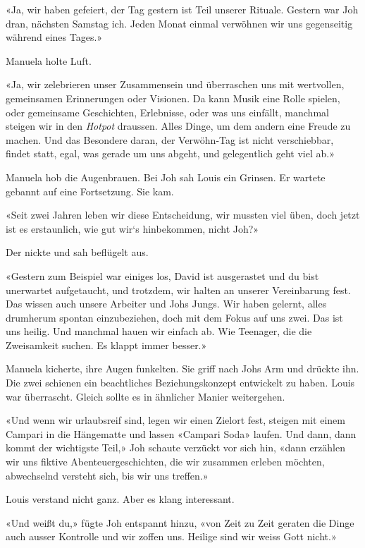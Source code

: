 «Ja, wir haben gefeiert, der Tag gestern ist Teil unserer Rituale.
Gestern war Joh dran, nächsten Samstag ich. Jeden Monat einmal verwöhnen
wir uns gegenseitig während eines Tages.»

Manuela holte Luft.

«Ja, wir zelebrieren unser Zusammensein und überraschen uns mit
wertvollen, gemeinsamen Erinnerungen oder Visionen. Da kann Musik eine
Rolle spielen, oder gemeinsame Geschichten, Erlebnisse, oder was uns
einfällt, manchmal steigen wir in den \emph{Hotpot} draussen. Alles
Dinge, um dem andern eine Freude zu machen. Und das Besondere daran, der
Verwöhn-Tag ist nicht verschiebbar, findet statt, egal, was gerade um
uns abgeht, und gelegentlich geht viel ab.»

Manuela hob die Augenbrauen. Bei Joh sah Louis ein Grinsen. Er wartete
gebannt auf eine Fortsetzung. Sie kam.

«Seit zwei Jahren leben wir diese Entscheidung, wir mussten viel üben,
doch jetzt ist es erstaunlich, wie gut wir`s hinbekommen, nicht Joh?»

Der nickte und sah beflügelt aus.

«Gestern zum Beispiel war einiges los, David ist ausgerastet und du bist
unerwartet aufgetaucht, und trotzdem, wir halten an unserer Vereinbarung
fest. Das wissen auch unsere Arbeiter und Johs Jungs. Wir haben gelernt,
alles drumherum spontan einzubeziehen, doch mit dem Fokus auf uns zwei.
Das ist uns heilig. Und manchmal hauen wir einfach ab. Wie Teenager, die
die Zweisamkeit suchen. Es klappt immer besser.»

Manuela kicherte, ihre Augen funkelten. Sie griff nach Johs Arm und
drückte ihn. Die zwei schienen ein beachtliches Beziehungskonzept
entwickelt zu haben. Louis war überrascht. Gleich sollte es in ähnlicher
Manier weitergehen.

«Und wenn wir urlaubsreif sind, legen wir einen Zielort fest, steigen
mit einem Campari in die Hängematte und lassen «Campari Soda» laufen.
Und dann, dann kommt der wichtigste Teil,» Joh schaute verzückt vor sich
hin, «dann erzählen wir uns fiktive Abenteuergeschichten, die wir
zusammen erleben möchten, abwechselnd versteht sich, bis wir uns
treffen.»

Louis verstand nicht ganz. Aber es klang interessant.

«Und weißt du,» fügte Joh entspannt hinzu, «von Zeit zu Zeit geraten die
Dinge auch ausser Kontrolle und wir zoffen uns. Heilige sind wir weiss
Gott nicht.»

